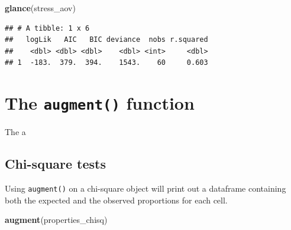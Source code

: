 \documentclass[
]{book}
\newenvironment{Shaded}{\begin{snugshade}}{\end{snugshade}}
\newcommand{\FunctionTok}[1]{\textcolor[rgb]{0.13,0.29,0.53}{\textbf{#1}}}
\newcommand{\NormalTok}[1]{#1}
\begin{document}
\begin{Shaded}
\begin{Highlighting}[]
\FunctionTok{glance}\NormalTok{(stress\_aov)}
\end{Highlighting}
\end{Shaded}

\begin{verbatim}
## # A tibble: 1 x 6
##   logLik   AIC   BIC deviance  nobs r.squared
##    <dbl> <dbl> <dbl>    <dbl> <int>     <dbl>
## 1  -183.  379.  394.    1543.    60     0.603
\end{verbatim}

\hypertarget{broom-augment}{%
\section{\texorpdfstring{The \texttt{augment()} function}{The augment() function}}\label{broom-augment}}

The a

\hypertarget{chi-square-tests}{%
\subsection{Chi-square tests}\label{chi-square-tests}}

Using \texttt{augment()} on a chi-square object will print out a dataframe containing both the expected and the observed proportions for each cell.

\begin{Shaded}
\begin{Highlighting}[]
\FunctionTok{augment}\NormalTok{(properties\_chisq)}
\end{Highlighting}
\end{Shaded}
\end{document}
